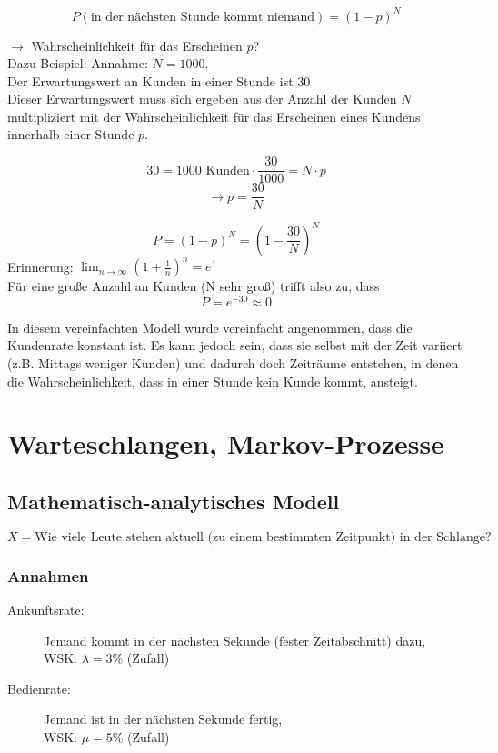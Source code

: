\documentclass[11pt, a4paper]{article}
\begin{document}
\begin{figure}[H]
\centering
{}
\end{figure}

\[P(\text{in der nächsten Stunde kommt niemand}) = (1-p)^{N}\]

$\rightarrow$ Wahrscheinlichkeit für das Erscheinen $p$?\\

Dazu Beispiel: Annahme: $N=1000$.\\
Der Erwartungswert an Kunden in einer Stunde ist $30$\\
Dieser Erwartungswert muss sich ergeben aus der Anzahl der Kunden $N$ multipliziert mit der Wahrscheinlichkeit für das Erscheinen eines Kundens innerhalb einer Stunde $p$.

\[30 = 1000 \text{ Kunden} \cdot \frac{30}{1000} = N \cdot p\]
\[\rightarrow p = \frac{30}{N}\]

\[P = (1-p)^{N} = (1-\frac{30}{N})^{N}\]
Erinnerung: $\lim_{n\rightarrow \infty}{(1+\frac{1}{n})^{n} = e^{1}}$\\

Für eine große Anzahl an Kunden (N sehr groß) trifft also zu, dass
\[P = e^{-30} \approx 0\]

In diesem vereinfachten Modell wurde vereinfacht angenommen, dass die Kundenrate konstant ist. Es kann jedoch sein, dass sie selbst mit der Zeit variiert (z.B. Mittags weniger Kunden) und dadurch doch Zeiträume entstehen, in denen die Wahrscheinlichkeit, dass in einer Stunde kein Kunde kommt, ansteigt.

\section{Warteschlangen, \glqq Markov-Prozesse\grqq}

\begin{figure}[H]
\centering
{}
\end{figure}

\subsection{Mathematisch-analytisches Modell}
\[X = \text{Wie viele Leute stehen aktuell (zu einem bestimmten Zeitpunkt) in der Schlange?}\]

\subsubsection{Annahmen}
\begin{description}
        \item[Ankunftsrate:] Jemand kommt in der nächsten Sekunde (fester Zeitabschnitt) dazu,\\ WSK: $\lambda = 3 \%$ (Zufall)
        \item[Bedienrate:] Jemand ist in der nächsten Sekunde fertig, \\WSK: $\mu = 5 \%$ (Zufall)
\end{description}
\end{document}

